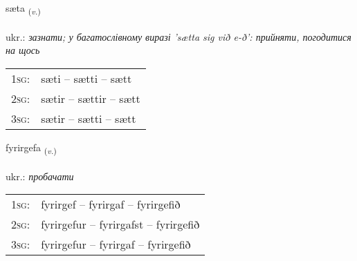 \documentclass[frontgrid, backgrid]{flacards}\usepackage[]{graphicx}\usepackage[]{xcolor}
\begin{document}
\renewcommand{\flhead}{\vskip5pt \fboxsep=0pt {\small\bfseries\footnotesize Sagnorð | дієслово}}
\renewcommand{\fcfoot}{\vskip5pt \fboxsep=0pt \hspace{2pt}{\small\bfseries\footnotesize 3K}}

\renewcommand{\blhead}{\vskip5pt {\small\bfseries\footnotesize Sagnorð | дієслово }}
\renewcommand{\bcfoot}{\vskip5pt \hspace{2pt}{\small\bfseries\footnotesize 3K}}


{sæta \small{\textsubscript{(\textit{v.})}} \\[1ex] %
\textphonetic{[saiːta]} \\
ukr.: \emph{зазнати; у багатослівному виразі 'sætta sig við e-ð': прийняти,  погодитися на щось} \\  [2ex]
\renewcommand*{\arraystretch}{0.8}
\begin{tabular}{p{1cm}l}
\textsc{1sg}: & sæti -- sætti -- sætt \\ 
\textsc{2sg}: & sætir -- sættir -- sætt \\ 
\textsc{3sg}: & sætir -- sætti -- sætt \\ 
\end{tabular}
}

\renewcommand{\flhead}{\vskip5pt \fboxsep=0pt {\small\bfseries\footnotesize Sagnorð | дієслово}}
\renewcommand{\fcfoot}{\vskip5pt \fboxsep=0pt \hspace{2pt}{\small\bfseries\footnotesize 3K}}

\renewcommand{\blhead}{\vskip5pt {\small\bfseries\footnotesize Sagnorð | дієслово }}
\renewcommand{\bcfoot}{\vskip5pt \hspace{2pt}{\small\bfseries\footnotesize 3K}}


{fyrirgefa \small{\textsubscript{(\textit{v.})}} \\[1ex] %
\textphonetic{[fɪːrɪrcɛva]} \\
ukr.: \emph{пробачати} \\  [2ex]
\renewcommand*{\arraystretch}{0.8}
\begin{tabular}{p{1cm}l}
\textsc{1sg}: & fyrirgef -- fyrirgaf -- fyrirgefið \\ 
\textsc{2sg}: & fyrirgefur -- fyrirgafst -- fyrirgefið \\ 
\textsc{3sg}: & fyrirgefur -- fyrirgaf -- fyrirgefið \\ 
\end{tabular}
}
\end{document}
